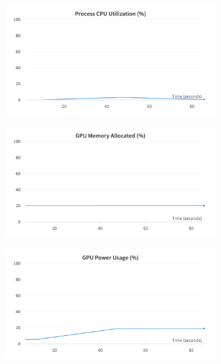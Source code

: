 \begin{figure}[H]
	\centering
	\begin{subfigure}{0.32\textwidth}
		\centering
		\includegraphics[width=\textwidth]{chapters/3_models/imgs/grrun/grruncputiliziation.png}
	\end{subfigure}
	\begin{subfigure}{0.32\textwidth}
		\centering
		\includegraphics[width=\textwidth]{chapters/3_models/imgs/grrun/grrungpumemalloc.png}
	\end{subfigure}
	\begin{subfigure}{0.32\textwidth}
		\centering
		\includegraphics[width=\textwidth]{chapters/3_models/imgs/grrun/grrungpupowerusageperc.png}

\end{subfigure}
\end{figure}
